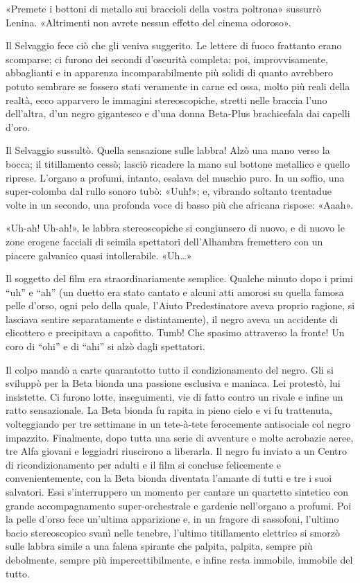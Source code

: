 \documentclass[
a5paper, %
10pt, %
twoside, 
onecolumn, %
openany, %
]{memoir}
\begin{document}
«Premete i bottoni di metallo sui braccioli della vostra poltrona» sussurrò Lenina. «Altrimenti non avrete nessun effetto del cinema odoroso».

Il Selvaggio fece ciò che gli veniva suggerito. Le lettere di fuoco frattanto erano scomparse; ci furono dei secondi d’oscurità completa; poi, improvvisamente, abbaglianti e in apparenza incomparabilmente più solidi di quanto avrebbero potuto sembrare se fossero stati veramente in carne ed ossa, molto più reali della realtà, ecco apparvero le immagini stereoscopiche, stretti nelle braccia l’uno dell’altra, d’un negro gigantesco e d’una donna Beta-Plus brachicefala dai capelli d’oro.

Il Selvaggio sussultò. Quella sensazione sulle labbra! Alzò una mano verso la bocca; il titillamento cessò; lasciò ricadere la mano sul bottone metallico e quello riprese. L’organo a profumi, intanto, esalava del muschio puro. In un soffio, una super-colomba dal rullo sonoro tubò: «Uuh!»; e, vibrando soltanto trentadue volte in un secondo, una profonda voce di basso più che africana rispose: «Aaah».

«Uh-ah! Uh-ah!», le labbra stereoscopiche si congiunsero di nuovo, e di nuovo le zone erogene facciali di seimila spettatori dell’Alhambra fremettero con un piacere galvanico quasi intollerabile. «Uh…»

Il soggetto del film era straordinariamente semplice. Qualche minuto dopo i primi “uh” e “ah” (un duetto era stato cantato e alcuni atti amorosi su quella famosa pelle d’orso, ogni pelo della quale, l’Aiuto Predestinatore aveva proprio ragione, si lasciava sentire separatamente e distintamente), il negro aveva un accidente di elicottero e precipitava a capofitto. Tumb! Che spasimo attraverso la fronte! Un coro di “ohi” e di “ahi” si alzò dagli spettatori.

Il colpo mandò a carte quarantotto tutto il condizionamento del negro. Gli si sviluppò per la Beta bionda una passione esclusiva e maniaca. Lei protestò, lui insistette. Ci furono lotte, inseguimenti, vie di fatto contro un rivale e infine un ratto sensazionale. La Beta bionda fu rapita in pieno cielo e vi fu trattenuta, volteggiando per tre settimane in un tete-à-tete ferocemente antisociale col negro impazzito. Finalmente, dopo tutta una serie di avventure e molte acrobazie aeree, tre Alfa giovani e leggiadri riuscirono a liberarla. Il negro fu inviato a un Centro di ricondizionamento per adulti e il film si concluse felicemente e convenientemente, con la Beta bionda diventata l’amante di tutti e tre i suoi salvatori. Essi s’interruppero un momento per cantare un quartetto sintetico con grande accompagnamento super-orchestrale e gardenie nell’organo a profumi. Poi la pelle d’orso fece un’ultima apparizione e, in un fragore di sassofoni, l’ultimo bacio stereoscopico svanì nelle tenebre, l’ultimo titillamento elettrico si smorzò sulle labbra simile a una falena spirante che palpita, palpita, sempre più debolmente, sempre più impercettibilmente, e infine resta immobile, immobile del tutto.
\end{document}
